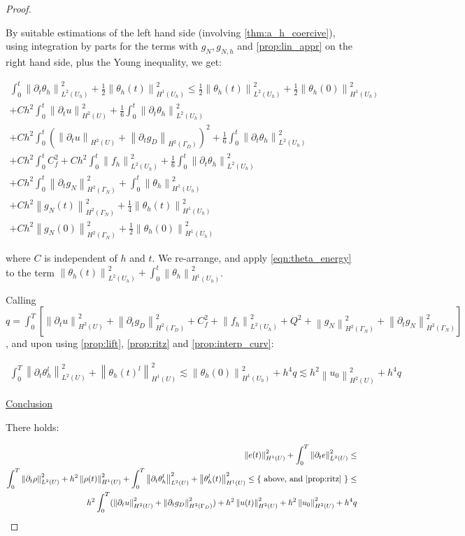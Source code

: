 \documentclass[english,a4paper,9pt,oneside]{scrbook}	%
\theoremstyle{break}
\newenvironment{mproof}[1][\proofname]{%
  \begin{proof}[#1]$ $\par\nobreak\ignorespaces
}{%
  \end{proof}
}
\renewcommand*{\proofname}{Proof}
\theoremstyle{remark}
\newcommand{\ds}{\displaystyle}
\newcommand{\norm}[1]{\left\lVert#1\right\rVert}
\newcommand{\ind}[1]{\{\text{ #1 }\}}
\begin{document}
\begin{appendices}
\begin{mproof}
By suitable estimations of the left hand side (involving \cref{thm:a_h_coercive}), using integration by parts for the terms with $g_N, g_{N,h}$ and \cref{prop:lin_appr} on the right hand side, plus the Young inequality, we get: 


\begin{align*}
\int_0^t\norm{\partial_t \theta_h}^2_{L^2(U_h)} + \frac{1}{2} \norm{\theta_h(t)}_{H^1(U_h)}^2 \leq  \frac{1}{2} \norm{\theta_h(t)}_{L^2(U_h)}^2 + \frac{1}{2} \norm{\theta_h(0)}_{H^1(U_h)}^2\\
+ Ch^2\int_0^t \norm{\partial_t u}_{H^2(U)}^2 + \frac{1}{6}\int_0^t\norm{\partial_t \theta_h}^2_{L^2(U_h)}\\
+ Ch^2\int_0^t(\norm{\partial_t u}_{H^2(U)}+	\norm{\partial_t g_D}_{H^2(\Gamma_D)})^2 + \frac{1}{6} \int_0^t\norm{\partial_t \theta_h}_{L^2(U_h)}^2\\
+ Ch^2\int_0^t C_f^2+ Ch^2\int_0^t \norm{f_h}_{L^2(U_h)}^2  + \frac{1}{6}\int_0^t\norm{\partial_t \theta_h}^2_{L^2(U_h)}\\ 
+ Ch^2\int_0^t \norm{\partial_t g_N}_{H^2(\Gamma_N)}^2 + \int_0^t \norm{ \theta_h}_{H^1(U_h)}^2\\
+ Ch^2\norm{g_N(t)}_{H^2(\Gamma_N)}^2 + \frac{1}{4}\norm{ \theta_h(t)}_{H^1(U_h)}^2\\
+ Ch^2\norm{g_N(0)}_{H^2(\Gamma_N)}^2 + \frac{1}{2}\norm{ \theta_h(0)}_{H^1(U_h)}^2
\end{align*}


where $C$ is independent of $h$ and $t$. We re-arrange, and apply \cref{eqn:theta_energy} to the term $\ds \norm{ \theta_h(t)}^2_{L^2(U_h)} + \int_0^t \norm{ \theta_h}_{H^1(U_h)}^2$. 

Calling $q=\ds \int_0^T \left [ \norm{\partial_t u}_{H^2(U)}^2 +	\norm{\partial_t g_D}_{H^2(\Gamma_D)}^2 + C_f^2 +  \norm{f_h}_{L^2(U_h)}^2 + Q^2+ \norm{g_N}_{H^2(\Gamma_N)}^2 + \norm{\partial_t g_N}_{H^2(\Gamma_N)}^2 \right ] $, and upon using \cref{prop:lift}, \cref{prop:ritz} and \cref{prop:interp_curv}:

\begin{align*}
\int_0^T\norm{\partial_t \theta_h^l}^2_{L^2(U)} + \norm{\theta_h(t)^l}_{H^1(U)}^2 \lesssim  \norm{\theta_h(0)}_{H^1(U_h)}^2+ h^4q \lesssim h^2\norm{u_0}_{H^2(U)}^2+ h^4q
\end{align*}

\underline{Conclusion}

There holds:

\begin{align*}
\norm{e(t)}_{H^1(U)}^2 + \int_0^T\norm{\partial_t e}^2_{L^2(U)}  \leq \\
\int_0^T\norm{\partial_t \rho}^2_{L^2(U)} + h^2\norm{\rho(t)}_{H^1(U)}^2 + \int_0^T\norm{\partial_t  \theta_h^l}^2_{L^2(U)} + \norm{ \theta_h^l(t)}_{H^1(U)}^2\leq \ind{above, and \cref{prop:ritz}}\leq \\
h^2\int_0^T(\norm{\partial_t u }_{H^2(U)}^2 + \norm{\partial_t g_D }_{H^2(\Gamma_D)}^2) + h^2\norm{u(t)}_{H^2(U)}^2 +  h^2\norm{u_0}_{H^2(U)}^2+ h^4q
\end{align*}
\end{mproof}


\end{appendices}
\end{document}
